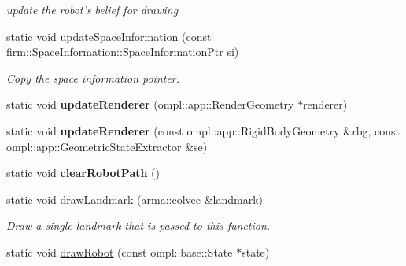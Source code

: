 \begin{DoxyCompactItemize}
\begin{DoxyCompactList}\small\item\em update the robot's belief for drawing \end{DoxyCompactList}\item 
\hypertarget{class_visualizer_a03f2c860d508cee10fdcf221fdfa8899}{static void \hyperlink{class_visualizer_a03f2c860d508cee10fdcf221fdfa8899}{update\-Space\-Information} (const firm\-::\-Space\-Information\-::\-Space\-Information\-Ptr si)}\label{class_visualizer_a03f2c860d508cee10fdcf221fdfa8899}

\begin{DoxyCompactList}\small\item\em Copy the space information pointer. \end{DoxyCompactList}\item 
\hypertarget{class_visualizer_acca6818239d3d2e8cabdfb7321e817b9}{static void {\bfseries update\-Renderer} (ompl\-::app\-::\-Render\-Geometry $\ast$renderer)}\label{class_visualizer_acca6818239d3d2e8cabdfb7321e817b9}

\item 
\hypertarget{class_visualizer_a3218c7fa2f83159188c624f04e982a24}{static void {\bfseries update\-Renderer} (const ompl\-::app\-::\-Rigid\-Body\-Geometry \&rbg, const ompl\-::app\-::\-Geometric\-State\-Extractor \&se)}\label{class_visualizer_a3218c7fa2f83159188c624f04e982a24}

\item 
\hypertarget{class_visualizer_abacab1d3c34cf91364ea0f45bc0f7473}{static void {\bfseries clear\-Robot\-Path} ()}\label{class_visualizer_abacab1d3c34cf91364ea0f45bc0f7473}

\item 
\hypertarget{class_visualizer_a2544a80a7ac2f432661f199e4cb08130}{static void \hyperlink{class_visualizer_a2544a80a7ac2f432661f199e4cb08130}{draw\-Landmark} (arma\-::colvec \&landmark)}\label{class_visualizer_a2544a80a7ac2f432661f199e4cb08130}

\begin{DoxyCompactList}\small\item\em Draw a single landmark that is passed to this function. \end{DoxyCompactList}\item 
\hypertarget{class_visualizer_a355fdbecb72d38f8a651c7dd75d1d6e1}{static void \hyperlink{class_visualizer_a355fdbecb72d38f8a651c7dd75d1d6e1}{draw\-Robot} (const ompl\-::base\-::\-State $\ast$state)}\label{class_visualizer_a355fdbecb72d38f8a651c7dd75d1d6e1}


\end{DoxyCompactItemize}
